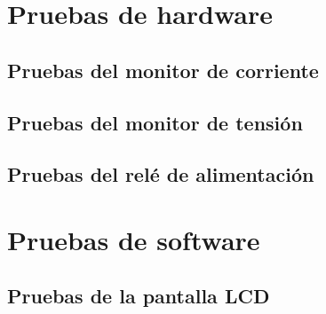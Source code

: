 \section{Pruebas de hardware}
\label{sec:pruebasHW}


\subsection{Pruebas del monitor de corriente}



\subsection{Pruebas del monitor de tensión}



\subsection{Pruebas del relé de alimentación}



\section{Pruebas de software}
\label{sec:pruebasSW}



\subsection{Pruebas de la pantalla LCD}

